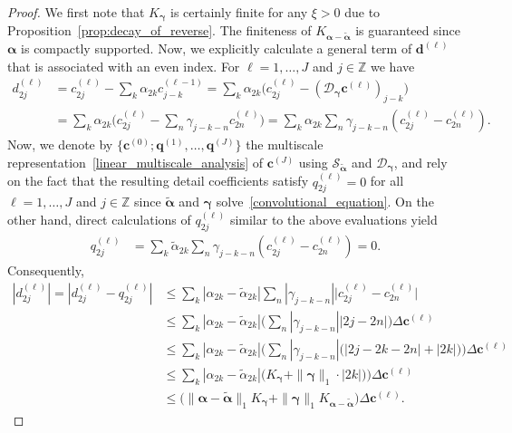 \documentclass[12pt]{article}
\begin{document}
\begin{proof}
    We first note that $K_{\boldsymbol{\gamma}}$ is certainly finite for any $\xi>0$ due to Proposition~\ref{prop:decay_of_reverse}. The finiteness of $K_{\boldsymbol{\alpha}-\widetilde{\boldsymbol{\alpha}}}$ is guaranteed since $\boldsymbol{\alpha}$ is compactly supported. Now, we explicitly calculate a general term of $\boldsymbol{d}^{(\ell)}$ that is associated with an even index. For $\ell=1,\dots,J$ and $j\in\mathbb{Z}$ we have
    \begin{align*}
        d^{(\ell)}_{2j} & = c^{(\ell)}_{2j} - \sum_{k}\alpha_{2k} c_{j-k}^{(\ell-1)}  = \sum_{k} \alpha_{2k} \big(c_{2j}^{(\ell)} - (\mathcal{D}_{\boldsymbol{\gamma}}\boldsymbol{c}^{(\ell)})_{j-k}\big)\\ & = \sum_{k} \alpha_{2k} \big(c_{2j}^{(\ell)} - \sum_{n}\gamma_{j-k-n}c^{(\ell)}_{2n}\big) = \sum_{k} \alpha_{2k} \sum_{n}\gamma_{j-k-n}(c_{2j}^{(\ell)} - c^{(\ell)}_{2n}).
    \end{align*}
    Now, we denote by $\{\boldsymbol{c}^{(0)};\boldsymbol{q}^{(1)},\dots,\boldsymbol{q}^{(J)}\}$ the multiscale representation~\eqref{linear_multiscale_analysis} of $\boldsymbol{c}^{(J)}$ using $\mathcal{S}_{\widetilde{\boldsymbol{\alpha}}}$ and $\mathcal{D}_{\boldsymbol{\gamma}}$, and rely on the fact that the resulting detail coefficients satisfy $q^{(\ell)}_{2j}=0$ for all $\ell=1,\dots,J$ and $j\in\mathbb{Z}$ since $\widetilde{\boldsymbol{\alpha}}$ and $\boldsymbol{\gamma}$ solve~\eqref{convolutional_equation}. On the other hand, direct calculations of $q^{(\ell)}_{2j}$ similar to the above evaluations yield
    \begin{align*}
        q^{(\ell)}_{2j} & = \sum_{k} \widetilde{\alpha}_{2k} \sum_{n}\gamma_{j-k-n}(c_{2j}^{(\ell)} - c^{(\ell)}_{2n})=0.
    \end{align*}
    Consequently,
    \begin{align*}
        |d^{(\ell)}_{2j}| = |d^{(\ell)}_{2j}-q^{(\ell)}_{2j}| & \leq \sum_{k} |\alpha_{2k}-\widetilde{\alpha}_{2k}| \sum_{n}|\gamma_{j-k-n}|\big|c_{2j}^{(\ell)} - c^{(\ell)}_{2n}\big|
        \\ & \leq \sum_{k} |\alpha_{2k}-\widetilde{\alpha}_{2k}| \bigg(\sum_{n}|\gamma_{j-k-n}||2j - 2n|\bigg)\Delta\boldsymbol{c}^{(\ell)}
        \\ & \leq \sum_{k} |\alpha_{2k}-\widetilde{\alpha}_{2k}| \bigg(\sum_{n}|\gamma_{j-k-n}|\big(|2j - 2k -2n|+|2k|\big)\bigg)\Delta\boldsymbol{c}^{(\ell)}
        \\ & \leq \sum_{k} |\alpha_{2k}-\widetilde{\alpha}_{2k}| \bigg(K_{\boldsymbol{\gamma}}+\|\boldsymbol{\gamma}\|_1\cdot|2k|\big)\bigg)\Delta\boldsymbol{c}^{(\ell)}
        \\ & \leq \big(\|\boldsymbol{\alpha} -\widetilde{\boldsymbol{\alpha}}\|_1K_{\boldsymbol{\gamma}} + \|\boldsymbol{\gamma}\|_1 K_{\boldsymbol{\alpha}-\widetilde{\boldsymbol{\alpha}}}\big)\Delta\boldsymbol{c}^{(\ell)}.
    \end{align*}
\end{proof}
\end{document}
